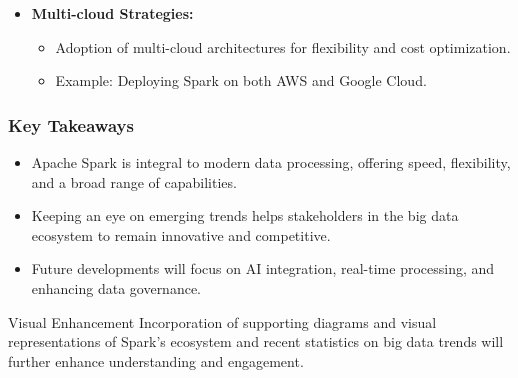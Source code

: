 \documentclass[aspectratio=169]{beamer}
\begin{document}
\begin{frame}[fragile]
\begin{itemize}
        \item \textbf{Multi-cloud Strategies:}
        \begin{itemize}
            \item Adoption of multi-cloud architectures for flexibility and cost optimization.
            \item Example: Deploying Spark on both AWS and Google Cloud.
        \end{itemize}
    \end{itemize}
\end{frame}

\begin{frame}[fragile]
    \frametitle{Key Takeaways}

    \begin{itemize}
        \item Apache Spark is integral to modern data processing, offering speed, flexibility, and a broad range of capabilities.
        \item Keeping an eye on emerging trends helps stakeholders in the big data ecosystem to remain innovative and competitive.
        \item Future developments will focus on AI integration, real-time processing, and enhancing data governance.
    \end{itemize}

    \vspace{0.5cm}
    \begin{block}{Visual Enhancement}
        Incorporation of supporting diagrams and visual representations of Spark’s ecosystem and recent statistics on big data trends will further enhance understanding and engagement.
    \end{block}
\end{frame}
\end{document}

